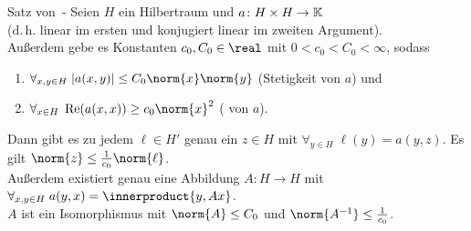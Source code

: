 \begin{Satz}{Satz von \upshape\,\!-}
    Seien $H$ ein Hilbertraum und $a\colon H \times H \rightarrow \mathbb{K}$ \\
    (d.\,h. linear im ersten und konjugiert linear im zweiten Argument).\\
    Außerdem gebe es Konstanten $c_0, C_0 \in \real$ mit $0 < c_0 < C_0 < \infty$, sodass
    \begin{enumerate}
        \item
        $\forall_{x, y \in H}\; |a(x, y)| \le C_0 \norm{x} \norm{y}$
        (Stetigkeit von $a$) und

        \item
        $\forall_{x \in H}\; \Re(a(x, x)) \ge c_0 \norm{x}^2$
        ( von $a$).
    \end{enumerate}
    Dann gibt es zu jedem $\ell \in H'$ genau ein $z \in H$ mit
    $\forall_{y \in H}\; \ell(y) = a(y, z)$.
    Es gilt $\norm{z} \le \frac{1}{c_0} \norm{\ell}$.\\
    Außerdem existiert genau eine Abbildung $A\colon H \rightarrow H$ mit
    $\forall_{x, y \in H}\; a(y, x) = \innerproduct{y, Ax}$.\\
    $A$ ist ein Isomorphismus mit $\norm{A} \le C_0$ und
    $\norm{A^{-1}} \le \frac{1}{c_0}$.
\end{Satz}

\pagebreak
